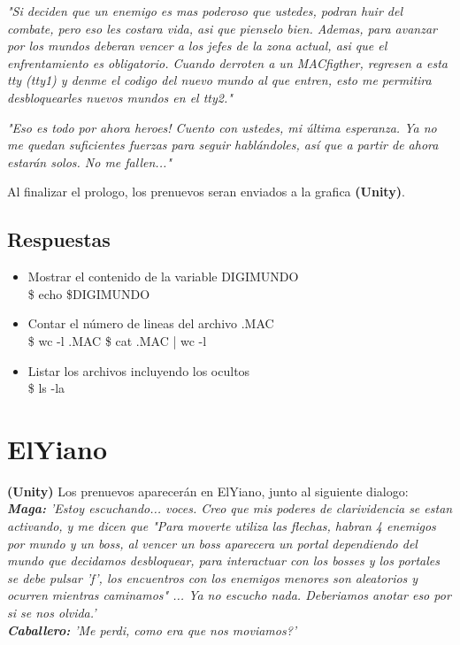 \documentclass[a4paper,10pt]{article}
\begin{document}
	\hspace{-1cm}\textit{"Si deciden que un enemigo es mas poderoso que ustedes, podran huir del combate, pero eso les costara vida, asi que pienselo bien. Ademas, para avanzar por los mundos deberan vencer a los jefes de la zona actual, asi que el enfrentamiento es obligatorio. Cuando derroten a un MACfigther, regresen a esta tty (tty1) y denme el codigo del nuevo mundo al que entren, esto me permitira desbloquearles nuevos mundos en el tty2."\\}
	
	\hspace{-1cm}\textit{"Eso es todo por ahora heroes! Cuento con ustedes, mi última esperanza. Ya no me quedan suficientes fuerzas para seguir hablándoles, así que a partir de ahora estarán solos. No me fallen..."\\}
	
	Al finalizar el prologo, los prenuevos seran enviados a la grafica \textbf{(Unity)}.
	
	\subsection{Respuestas}
		\begin{itemize}
			\item Mostrar el contenido de la variable DIGIMUNDO\\
				\$ echo \$DIGIMUNDO
			\item Contar el n\'umero de lineas del archivo .MAC\\
				\$ wc -l .MAC
				\$ cat .MAC | wc -l
			\item Listar los archivos incluyendo los ocultos\\
				\$ ls -la
		\end{itemize}	 
	
	
\section{ElYiano}	
	\textbf{(Unity)} Los prenuevos aparecer\'an en ElYiano, junto al siguiente dialogo:\\
	
	\hspace{-1cm}\textit{\textbf{Maga:} 'Estoy escuchando... voces. Creo que mis poderes de clarividencia se estan activando, y me dicen que "Para moverte utiliza las flechas, habran 4 enemigos por mundo y un boss, al vencer un boss aparecera un portal dependiendo del mundo que decidamos desbloquear, para interactuar con los bosses y los portales se debe pulsar 'f', los encuentros con los enemigos menores son aleatorios y ocurren mientras caminamos" ... Ya no escucho nada. Deberiamos anotar eso por si se nos olvida.'\\}
	\hspace{-1cm}\textit{\textbf{Caballero:} 'Me perdi, como era que nos moviamos?'\\}
	
\end{document}
